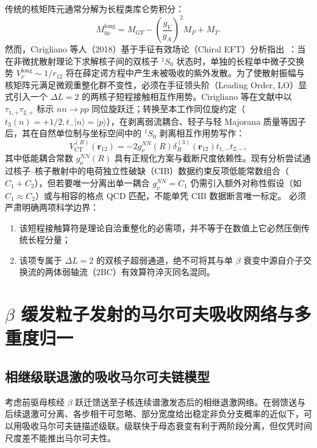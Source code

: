 传统的核矩阵元通常分解为长程类库仑势积分：
\begin{equation}\label{eq:appD-0nubb-long-range}
M_{0\nu}^{\mathrm{long}} = M_{GT} - \left(\frac{g_V}{g_A}\right)^2 M_F + M_T.
\end{equation}
然而，Cirigliano 等人（2018）基于手征有效场论（Chiral EFT）分析指出~\cite{cirigliano-2018-leading-short-range-double-beta}：当在非微扰散射理论下求解核子间的双核子 $^1S_0$ 状态时，单独的长程单中微子交换势 $V_\nu^{\mathrm{long}} \sim 1/r_{12}$ 将在薛定谔方程中产生未被吸收的紫外发散。为了使散射振幅与核矩阵元满足微观重整化群不变性，必须在手征领头阶（Leading Order, LO）显式引入一个 $\Delta L = 2$ 的两核子短程接触相互作用势。Cirigliano 等在文献中以 $\tau_{1,+} \tau_{2,+}$ 标示 $n n \to p p$ 同位旋跃迁；转换至本工作同位旋约定（$t_3(n) = +1/2, t_- |n\rangle = |p\rangle$），在剥离弱流耦合、轻子与轻 Majorana 质量等因子后，其在自然单位制与坐标空间中的 $^1S_0$ 剥离相互作用势写作：
\begin{equation}\label{eq:appD-contact-potential}
V_{\mathrm{CT}}^{(R)}(\mathbf{r}_{12}) = -2 g_\nu^{NN}(R) \delta_R^{(3)}(\mathbf{r}_{12}) t_{1,-} t_{2,-},
\end{equation}
其中低能耦合常数 $g_\nu^{NN}(R)$ 具有正规化方案与截断尺度依赖性。现有分析尝试通过核子--核子散射中的电荷独立性破缺（CIB）数据约束反项低能常数组合（$C_1 + C_2$），但若要唯一分离出单一耦合 $g_\nu^{NN} = C_1$ 仍需引入额外对称性假设（如 $C_1 \approx C_2$）或与相容的格点 QCD 匹配，不能单凭 CIB 数据断言唯一标定。
必须严肃明确两项科学边界：
\begin{enumerate}
\item 该短程接触算符是理论自洽重整化的必需项，并不等于在数值上它必然压倒传统长程分量；
\item 该项专属于 $\Delta L = 2$ 的双核子超弱通道，绝不可将其与单 $\beta$ 衰变中源自介子交换流的两体弱轴流（2BC）有效算符淬灭同名混同。
\end{enumerate}

\section{$\beta$ 缓发粒子发射的马尔可夫吸收网络与多重度归一}\label{sec:appD-delayed-neutron-network}

\subsection{相继级联退激的吸收马尔可夫链模型}

考虑前驱母核经 $\beta$ 跃迁馈送至子核连续谱激发态后的相继退激网络。在弱馈送与后续退激可分离、各步相干可忽略、部分宽度给出稳定非负分支概率的近似下，可以用吸收马尔可夫链描述级联。级联快于母态衰变有利于两阶段分离，但仅凭时间尺度差不能推出马尔可夫性。

